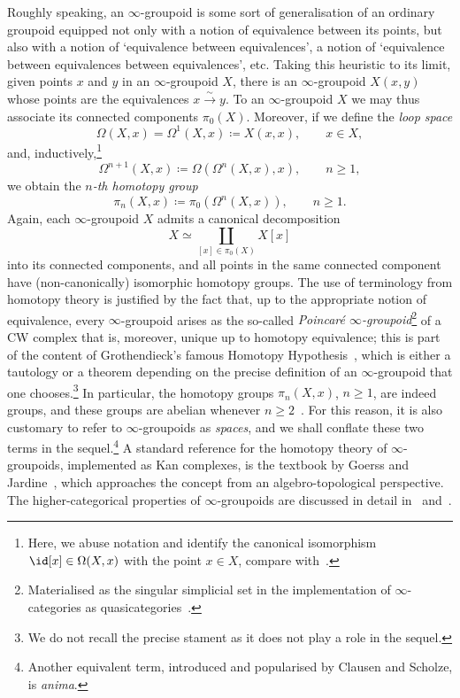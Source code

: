 \documentclass[a4paper]{amsart}
\begin{document}
Roughly speaking, an $\infty$-groupoid is some sort of generalisation of an
ordinary groupoid equipped not only with a notion of equivalence between its
points, but also with a notion of `equivalence between equivalences', a notion
of `equivalence between equivalences between equivalences', etc. Taking this
heuristic to its limit, given points $x$ and $y$ in an $\infty$-groupoid $X$,
there is an $\infty$-groupoid $X(x,y)$ whose points are the equivalences
$x\stackrel{\sim}{\to}y$. To an $\infty$-groupoid $X$ we may thus associate its
connected components $\pi_0(X)$. Moreover, if we define the \emph{loop space}
\[
  \Omega(X,x)=\Omega^1(X,x)\coloneqq X(x,x),\qquad x\in X,
\]
and, inductively,\footnote{Here, we abuse notation and identify the canonical
  isomorphism $\id[x]\in\Omega(X,x)$ with the point $x\in X$, compare
  with~\cite[Section~3.8.1]{Cis19}.}
\[
  \Omega^{n+1}(X,x)\coloneqq \Omega(\Omega^n(X,x),x),\qquad n\geq1,
\]
we obtain the \emph{$n$-th homotopy group}
\[
  \pi_n(X,x)\coloneqq\pi_0(\Omega^n(X,x)),\qquad n\geq1.
\]
Again, each $\infty$-groupoid $X$ admits a canonical decomposition
\[
  X\simeq\coprod_{[x]\in\pi_0(X)}X[x]
\]
into its connected components, and all points in the same connected component
have (non-canonically) isomorphic homotopy groups. The use
of terminology from homotopy theory is justified by the fact that, up to the
appropriate notion of equivalence, every $\infty$-groupoid arises as the
so-called \emph{Poincar{\'e} $\infty$-groupoid}\footnote{Materialised as the
  singular simplicial set in the implementation of $\infty$-categories as
  quasicategories~\cite[Remark~7.8.11]{Cis19}.} of a CW complex that is,
moreover, unique up to homotopy equivalence; this is part of the content of
Grothendieck's famous Homotopy Hypothesis~\cite{Gro22}, which is either a
tautology or a theorem depending on the precise definition of an
$\infty$-groupoid that one chooses.\footnote{We do not recall the precise stament
  as it does not play a role in the sequel.} In particular, the homotopy groups
$\pi_n(X,x)$, $n\geq1$, are indeed groups, and these groups are abelian whenever
$n\geq2$~\cite[Proposition~3.8.2]{Cis19}. For this reason, it is also customary
to refer to $\infty$-groupoids as \emph{spaces}, and we shall conflate these two
terms in the sequel.\footnote{Another equivalent term, introduced and
  popularised by Clausen and Scholze, is \emph{anima}.} A standard reference for
the homotopy theory of $\infty$-groupoids, implemented as Kan complexes, is the
textbook by Goerss and Jardine~\cite{GJ99}, which approaches the concept from an
algebro-topological perspective. The higher-categorical properties of
$\infty$-groupoids are discussed in detail in~\cite{Cis19} and~\cite{kerodon}.
\end{document}

